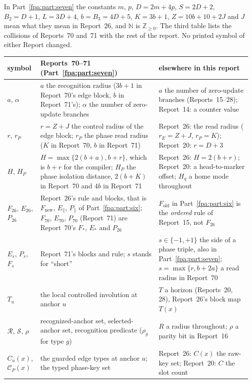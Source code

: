 \documentclass[11pt,a4paper]{article}
\numberwithin{equation}{section}
\begin{document}
In Part~\ref{fpa:part:seven} the constants $m$, $p$, $D=2m+4p$, $S=2D+2$, $B_2=D+1$, $L=3D+4$, $b=B_3=4D+5$, $K=3b+1$, $Z=10b+10+2J$ and $J$ mean what they mean in Report~26, and $\mathbb N$ is $\mathbb Z_{\ge0}$. The third table lists the collisions of Reports~70 and~71 with the rest of the report. No printed symbol of either Report changed.
\begin{center}
\small
\begin{longtable}{@{}>{\raggedright\arraybackslash}p{}p{}p{}@{}}
\toprule
symbol & Reports~70--71 (Part~\ref{fpa:part:seven}) & elsewhere in this report\\
\midrule
\endhead
$a$, $\alpha$ & $a$ the recognition radius ($3b+1$ in Report~70's edge block, $b$ in Report~71's); $\alpha$ the number of zero-update branches & $a$ the number of zero-update branches (Reports~15--28); Report~14: a counter value\\
$r$, $r_P$ & $r=Z+J$ the control radius of the edge block; $r_P$ the phase read radius ($K$ in Report~70, $b$ in Report~71) & Report~26: the read radius ($r_E=Z+J$, $r_P=K$); Report~20: $r=D+3$\\
$H$, $H_P$ & $H=\max\{2(b+a),b+r\}$, which is $b+r$ for the compiler; $H_P$ the phase isolation distance, $2(b+K)$ in Report~70 and $4b$ in Report~71 & Report~26: $H=2(b+r)$; Report~20: a head-to-marker offset; $H_q$ a home mode throughout\\
$F_{26}$, $E_{26}$, $P_{26}$ & Report~26's rule and blocks, that is $F_{\mathrm{new}}$, $E_\parallel$, $P_\parallel$ of Part~\ref{fpa:part:six}; $F_{70}$, $E_{70}$, $P_{70}$ (Report~71) are Report~70's $F_*$, $E_*$ and $P_{26}$ & $F_{\mathrm{old}}$ in Part~\ref{fpa:part:six} is the \emph{ordered} rule of Report~15, not $F_{26}$\\
$E_s$, $P_s$, $F_s$ & Report~71's blocks and rule; $s$ stands for ``short'' & $s\in\{-1,+1\}$ the side of a phase triple, also in Part~\ref{fpa:part:seven}; $s=\max\{r,b+2a\}$ a read radius in Report~70\\
$T_u$ & the local controlled involution at anchor $u$ & $T$ a horizon (Reports~20, 28), Report~26's block map $T(x)$\\
$\mathcal R$, $\mathcal S$, $\rho$ & recognized-anchor set, selected-anchor set, recognition predicate ($\rho_g$ for type $g$) & $R$ a radius throughout; $\rho$ a parity bit in Report~16\\
$C_u(x)$, $\mathcal C_P(x)$ & the guarded edge types at anchor $u$; the typed phase-key set & Report~26: $C(x)$ the raw-key set; Report~20: $C$ the slot count\\

\end{longtable}
\end{center}
\end{document}
